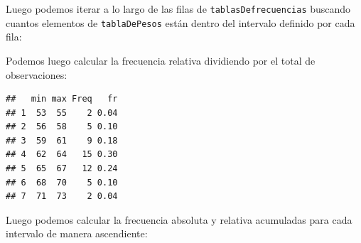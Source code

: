 \documentclass[twocolumn]{article}
\newenvironment{Shaded}{\begin{snugshade}}{\end{snugshade}}
\newcommand{\KeywordTok}[1]{\textcolor[rgb]{0.13,0.29,0.53}{\textbf{#1}}}
\newcommand{\DecValTok}[1]{\textcolor[rgb]{0.00,0.00,0.81}{#1}}
\newcommand{\StringTok}[1]{\textcolor[rgb]{0.31,0.60,0.02}{#1}}
\newcommand{\ControlFlowTok}[1]{\textcolor[rgb]{0.13,0.29,0.53}{\textbf{#1}}}
\newcommand{\OperatorTok}[1]{\textcolor[rgb]{0.81,0.36,0.00}{\textbf{#1}}}
\newcommand{\NormalTok}[1]{#1}
\begin{document}
Luego podemos iterar a lo largo de las filas de
\texttt{tablasDefrecuencias} buscando cuantos elementos de
\texttt{tablaDePesos} están dentro del intervalo definido por cada fila:

\begin{Shaded}
\end{Shaded}

Podemos luego calcular la frecuencia relativa dividiendo por el total de
observaciones:

\begin{Shaded}
\end{Shaded}

\begin{verbatim}
##   min max Freq   fr
## 1  53  55    2 0.04
## 2  56  58    5 0.10
## 3  59  61    9 0.18
## 4  62  64   15 0.30
## 5  65  67   12 0.24
## 6  68  70    5 0.10
## 7  71  73    2 0.04
\end{verbatim}

Luego podemos calcular la frecuencia absoluta y relativa acumuladas para
cada intervalo de manera ascendiente:

\begin{Shaded}
\end{Shaded}
\end{document}
